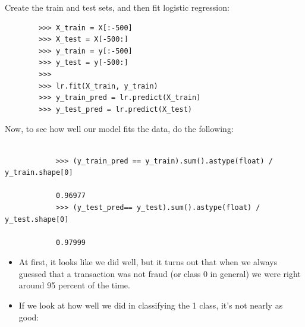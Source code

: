 \documentclass[SKL-MASTER.tex]{subfiles}
\begin{document}
	\noindent Create the train and test sets, and then fit logistic regression:
	\begin{framed}
		\begin{verbatim}
		>>> X_train = X[:-500]
		>>> X_test = X[-500:]
		>>> y_train = y[:-500]
		>>> y_test = y[-500:]
		>>>
		>>> lr.fit(X_train, y_train)
		>>> y_train_pred = lr.predict(X_train)
		>>> y_test_pred = lr.predict(X_test)
		\end{verbatim}
	\end{framed}
	\newpage
\noindent	Now, to see how well our model fits the data, do the following:
	{
		\large
		\begin{framed}
			\begin{verbatim}
			
			>>> (y_train_pred == y_train).sum().astype(float) / y_train.shape[0]
			
			0.96977
			>>> (y_test_pred== y_test).sum().astype(float) / y_test.shape[0]
			
			0.97999
			\end{verbatim}
		\end{framed}
	}
	\begin{itemize}
		\item At first, it looks like we did well, but it turns out that when we always guessed that a transaction
		was not fraud (or class 0 in general) we were right around 95 percent of the time. 
		\item If we look at
		how well we did in classifying the 1 class, it's not nearly as good:
	\end{itemize}
	
\end{document}
